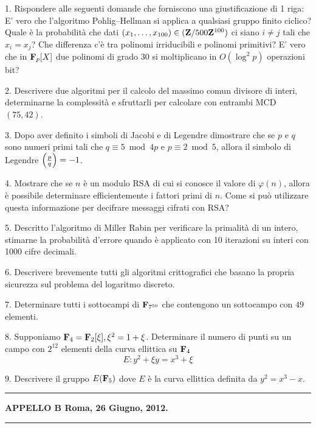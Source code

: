 \item{1.} Rispondere alle seguenti domande che forniscono una giustificazione di 1 riga:
 E' vero che l'algoritmo Pohlig--Hellman si applica a qualsiasi gruppo finito ciclico?
 Quale \`e la probabilit\`a che dati $(x_1,\ldots,x_{100})\in({\bf Z}/500{\bf Z}^{100})$ 
ci siano $i\neq j$ tali che $x_i= x_j$?
 Che differenza c'\`e tra polinomi irriducibili e polinomi primitivi?
 E' vero che in ${\bf F}_p[X]$ due polinomi di grado $30$ si moltiplicano in $O(\log^2p)$ operazioni bit?
\item{2.} Descrivere due algoritmi per il calcolo del massimo comun divisore di interi, determinarne la complessit\`a e sfruttarli
per calcolare con entrambi MCD$(75,42)$.
\item{3.} Dopo aver definito i simboli di Jacobi e di Legendre dimostrare che se $p$ e $q$ sono numeri primi tali che $q\equiv5\bmod 4p$ e 
$p\equiv2\bmod5$, allora il simbolo di Legendre $\left({p\over q}\right)=-1$.
\item{4.} Mostrare che se $n$ \`e un modulo RSA di cui si conosce il valore di $\varphi(n)$, allora \`e possibile
determinare efficientemente i fattori primi di $n$. Come si pu\`o utilizzare questa informazione
per decifrare messaggi cifrati con RSA?
\item{5.} Descritto l'algoritmo di Miller Rabin per verificare la primalit\`a di un intero, stimarne la probabilit\`a
d'errore quando \`e applicato con 10 iterazioni su interi con 1000 cifre decimali.
\item{6.} Descrivere brevemente tutti gli algoritmi crittografici che basano la propria sicurezza sul problema del logaritmo
discreto.
\item{7.} Determinare tutti i sottocampi di ${\bf F}_{7^{50}}$ che contengono un sottocampo con $49$ elementi.
\item{8.} Supponiamo ${\bf F}_4={\bf F}_2[\xi], \xi^2=1+\xi$. 
Determinare il numero di punti su un campo con $2^{12}$ elementi della curva ellittica su ${\bf F}_4$ 
$$E: y^2+\xi y=x^3+\xi$$
\item{9.} Descrivere il gruppo $E({\bf F}_5)$ dove $E$ \`e la curva ellittica definita da $y^2=x^3-x$.
\bigskip

\hrule
\centerline{{\bf APPELLO B \hfill Roma, 26 Giugno, 2012.}} \hrule

